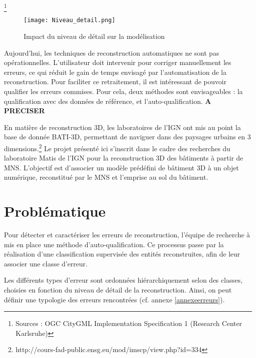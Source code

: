 \footnote{Sources : OGC CityGML Implementation Specification 1 (Research Center Karlsruhe)}
\begin{figure}[!h]
	\begin{center}
		\texttt{[image: Niveau\_detail.png]}  \\
		\caption[Impact du niveau de détail sur la modélisation]{Impact du niveau de détail sur la modélisation}
		\label{fig:LOD}
	\end{center}
\end{figure}

Aujourd'hui, les techniques de reconstruction automatiques ne sont pas opérationnelles. L’utilisateur doit intervenir pour corriger manuellement les erreurs, ce qui réduit le gain de temps envisagé par l'automatisation de la reconstruction. Pour faciliter ce retraitement, il est intéressant de pouvoir qualifier les erreurs commises. Pour cela, deux méthodes sont envisageables : la qualification avec des données de référence, et l’auto-qualification. \textbf{A PRECISER} \newline

En matière de reconstruction 3D, les laboratoires de l'IGN ont mis au point la base de donnée BATI-3D, permettant de naviguer dans des paysages urbains en 3 dimensions.\footnote{http://cours-fad-public.ensg.eu/mod/imscp/view.php?id=334} Le projet présenté ici s’inscrit dans le cadre des recherches du laboratoire Matis de l'IGN pour la reconstruction 3D des bâtiments à partir de MNS. L'objectif est d'associer un modèle prédéfini de bâtiment 3D à un objet numérique, reconstitué par le MNS et l’emprise au sol du bâtiment. \newline

\section{Problématique}

Pour détecter et caractériser les erreurs de reconstruction, l’équipe de recherche à mis en place une méthode d'auto-qualification. Ce processus passe par la réalisation d'une classification supervisée des entités reconstruites, afin de leur associer une classe d'erreur. \newline

Les différents types d'erreur sont ordonnées hiérarchiquement selon des classes, choisies en fonction du niveau de détail de la reconstruction. Ainsi, on peut définir une typologie des erreurs rencontrées (cf. annexe \ref{annexeerreurs}).\newline

